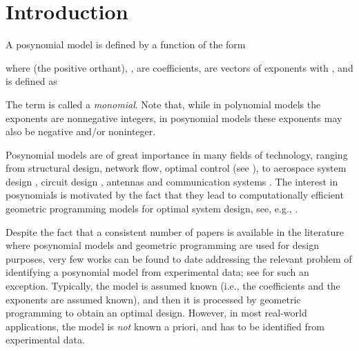 \documentclass[11pt]{article}
\begin{document}
\section{Introduction}

A posynomial model is defined by a function  of the form 

where  (the positive orthant), ,
 are coefficients, 
are vectors of exponents with , and 
is defined as 

The term  is called a {\em monomial}. Note that, while
in polynomial models the exponents  are nonnegative
integers, in posynomial models these exponents may also be negative
and/or noninteger.

Posynomial models are of great importance in many fields of technology,
ranging from structural design, network flow, optimal control (see
\cite{BePh76,Wilde78}), to aerospace system design \cite{HoAb12},
circuit design \cite{bkph05,DaGiSa03,SaRaVaKa93}, antennas \cite{BaLaDoHa10}
and communication systems \cite{Chiang05}. The interest in posynomials
is motivated by the fact that they lead to computationally efficient
geometric programming models for optimal system design, see, e.g.,
\cite{gp_67,BePh76,Wilde78}.

Despite the fact that a  consistent number of papers is available in the literature
where posynomial models and geometric programming are used for design
purposes, very few works can be found to date addressing the relevant problem
of identifying a posynomial model from experimental data; see \cite{DaGiSa03}
for such an exception. Typically, the model is  assumed known (i.e.,
the coefficients  and the exponents  are assumed
known), and then it is processed by  geometric programming to obtain an optimal design.
However, in most real-world applications, the model is {\em not}
known a priori, and has to be identified from experimental data.
\end{document}
